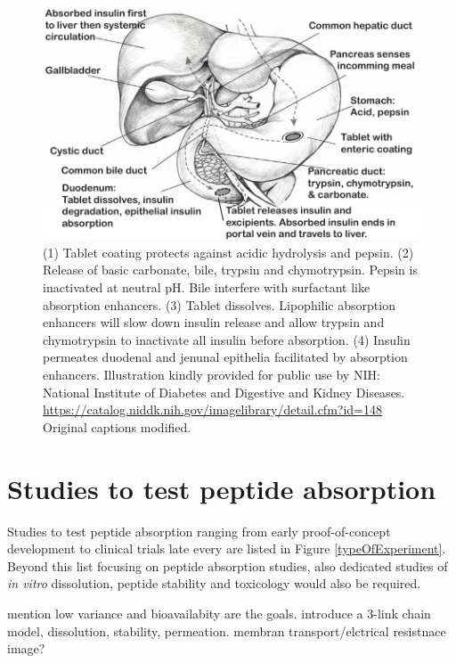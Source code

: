 \begin{figure}[h]

\includegraphics{graphics/intro_anatomy2.pdf}
\caption{(1) Tablet coating protects against acidic hydrolysis and pepsin. (2) Release of basic carbonate, bile, trypsin and chymotrypsin. Pepsin is inactivated at neutral pH. Bile interfere with surfactant like absorption enhancers. (3) Tablet dissolves. Lipophilic absorption enhancers will slow down insulin release and allow trypsin and chymotrypsin to inactivate all insulin before absorption. (4) Insulin permeates duodenal and jenunal epithelia facilitated by absorption enhancers. Illustration kindly provided for public use by NIH: National Institute of Diabetes and Digestive and Kidney Diseases. \url{https://catalog.niddk.nih.gov/imagelibrary/detail.cfm?id=148} Original captions modified.}
\label{intro_glucoseTolerance}
\end{figure}

\section{Studies to test peptide absorption}
Studies to test peptide absorption ranging from early proof-of-concept development to clinical trials late every are listed in Figure \ref{typeOfExperiment}. Beyond this list focusing on peptide absorption studies, also dedicated studies of \textit{in vitro} dissolution, peptide stability and toxicology would also be required.

mention low variance and bioavailabity are the goals.
introduce a 3-link chain model, dissolution, stability, permeation. 
membran transport/elctrical resistnace image?

